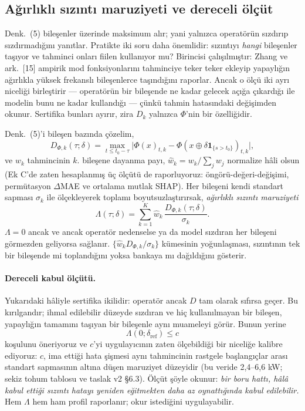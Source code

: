 \documentclass[11pt,a4paper]{article}
\begin{document}
\subsection{Ağırlıklı sızıntı maruziyeti ve dereceli ölçüt}

Denk.~(5) bileşenler üzerinde maksimum alır; yani yalnızca operatörün sızdırıp
sızdırmadığını yanıtlar. Pratikte iki soru daha önemlidir: sızıntıyı
\emph{hangi} bileşenler taşıyor ve tahminci onları fiilen kullanıyor mu?
Birincisi çalışılmıştır: Zhang ve ark.~[15] ampirik mod fonksiyonlarını
tahminciye teker teker ekleyip yapaylığın ağırlıkla yüksek frekanslı
bileşenlerce taşındığını raporlar. Ancak o ölçü iki ayrı niceliği birleştirir ---
operatörün bir bileşende ne kadar gelecek açığa çıkardığı ile modelin bunu ne
kadar kullandığı --- çünkü tahmin hatasındaki değişimden okunur. Sertifika
bunları ayırır, zira $D_k$ yalnızca $\Phi$'nin bir özelliğidir.

Denk.~(5)'i bileşen bazında çözelim,
\begin{equation}
D_{\Phi,k}(\tau;\delta)=
\max_{t\le t_0-\tau}
\bigl|\Phi(x)_{t,k}-\Phi\!\left(x\oplus\delta\mathbf 1_{\{s>t_0\}}\right)_{t,k}\bigr| ,
\label{eq:profilek}
\end{equation}
ve $w_k$ tahmincinin $k$. bileşene dayanma payı,
$\hat w_k = w_k/\sum_j w_j$ normalize hâli olsun (Ek C'de zaten hesaplanmış üç
ölçütü de raporluyoruz: öngörü-değeri-değişimi, permütasyon $\Delta$MAE ve
ortalama mutlak SHAP). Her bileşeni kendi standart sapması $\sigma_k$ ile
ölçekleyerek toplamı boyutsuzlaştırırsak, \emph{ağırlıklı sızıntı maruziyeti}
\begin{equation}
\Lambda(\tau;\delta)=\sum_{k=1}^{K}\hat w_k\,\frac{D_{\Phi,k}(\tau;\delta)}{\sigma_k}.
\label{eq:exposure}
\end{equation}
$\Lambda=0$ ancak ve ancak operatör nedenselse ya da model sızdıran her bileşeni
görmezden geliyorsa sağlanır. $\{\hat w_k D_{\Phi,k}/\sigma_k\}$ kümesinin
yoğunlaşması, sızıntının tek bir bileşende mi toplandığını yoksa bankaya mı
dağıldığını gösterir.

\paragraph{Dereceli kabul ölçütü.} Yukarıdaki hâliyle sertifika ikilidir:
operatör ancak $D$ tam olarak sıfırsa geçer. Bu kırılgandır; ihmal edilebilir
düzeyde sızdıran ve hiç kullanılmayan bir bileşen, yapaylığın tamamını taşıyan
bir bileşenle aynı muameleyi görür. Bunun yerine
\begin{equation}
\Lambda(0;\delta_{\mathrm{ref}})\le c
\label{eq:criterion}
\end{equation}
koşulunu öneriyoruz ve $c$'yi uygulayıcının zaten ölçebildiği bir niceliğe
kalibre ediyoruz: $c$, ima ettiği hata şişmesi aynı tahmincinin rastgele
başlangıçlar arası standart sapmasının altına düşen maruziyet düzeyidir (bu
veride 2,4--6,6 kW; sekiz tohum tablosu ve taslak v2 §6.3). Ölçüt şöyle okunur:
\emph{bir boru hattı, hâlâ kabul ettiği sızıntı hatayı yeniden eğitmekten daha
az oynattığında kabul edilebilir.} Hem $\Lambda$ hem ham profil raporlanır; okur
istediğini uygulayabilir.
\end{document}
